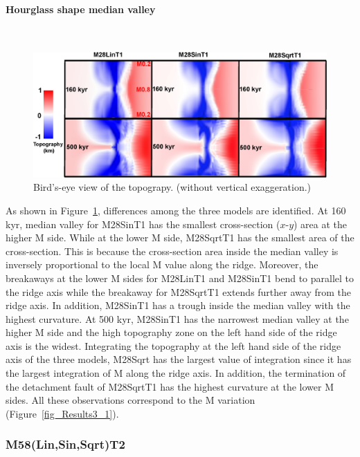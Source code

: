 \paragraph{Hourglass shape median valley}
~\\
\begin{figure}[h]
  \centering
    \includegraphics[width=1.0\textwidth]{./Figures/fig_Results_3_3_1_hourglass.eps}
  \caption{Bird's-eye view of the topograpy. (without vertical exaggeration.)}
 \label{fig_Results_3_3_1_hourglass}
\end{figure} 

As shown in Figure~\hyperref[fig_Results_3_3_1_hourglass]{\ref{fig_Results_3_3_1_hourglass}}, differences among the three models are identified. At 160 kyr, median valley for M28SinT1 has the smallest cross-section ($x$-$y$) area at the higher M side. While at the lower M side,  M28SqrtT1 has the smallest area of the cross-section. This is because the cross-section area inside the median valley is inversely proportional to the local M value along the ridge. Moreover, the breakaways at the lower M sides for M28LinT1 and M28SinT1 bend to parallel to the ridge axis while the breakaway for M28SqrtT1 extends further away from the ridge axis. In addition, M28SinT1 has a trough inside the median valley with the highest curvature. At 500 kyr, M28SinT1 has the narrowest median valley at the higher M side and the high topography zone on the left hand side of the ridge axis is the widest. Integrating the topography at the left hand side of the ridge axis of the three models, M28Sqrt has the largest value of integration since it has the largest integration of M along the ridge axis. In addition, the termination of the detachment fault of M28SqrtT1 has the highest curvature at the lower M sides. All these observations correspond to the M variation (Figure~\hyperref[fig_Results3_1]{\ref{fig_Results3_1}}).

\subsubsection{M58(Lin,Sin,Sqrt)T2}

